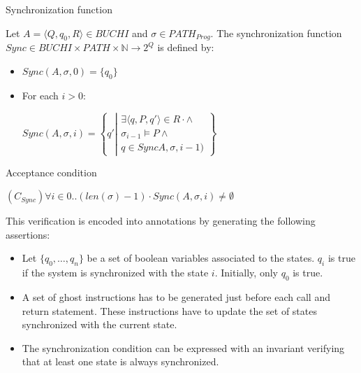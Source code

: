 \documentclass{frama-c-book}
\begin{document}
\begin{definition}{Synchronization function}
\label{def-synchro}

Let
${A=\langle Q,q_0,R \rangle \in \textit{BUCHI}}$ and
${\sigma \in \textit{PATH}_{\textit{Prog}}}$.
The synchronization function ${\textit{Sync}\in\textit{BUCHI} \times
  \textit{PATH} \times \mathbb{N} \rightarrow 2^Q}$ is defined by:

\begin{itemize}
\item $\textit{Sync}(A,\sigma,0) = \{q_0\}$
\item {\color{darkgray}For each $i>0$:}

\centerline{
${\textit{Sync}(A,\sigma,i) =
 \left \{ q' \left |  \begin{array}{c}
                                        \exists \langle q,P,q' \rangle
                                        \in R \cdot \wedge\\
                                        \sigma_{i-1} \models
                                        P \wedge\\
                                        q \in
                                        \textit{Sync}A,\sigma,i-1)
                                      \end{array}
  \right . \right \}} $}
\end{itemize}
\end{definition}

\begin{definition}{Acceptance condition}

\centering
$(C_{Sync})$\hfill $\forall i \in 0..(\textit{len}(\sigma)-1) \cdot
\textit{Sync}(A,\sigma,i) \not = \emptyset$\hfill ~
\end{definition}

This verification is encoded into annotations by generating the following assertions:

\begin{itemize}
  \item[Declaration] Let $\{q_0,\dots,q_n\}$ be a set of boolean variables
    associated to the states. $q_i$ is true if the system is synchronized with
    the state $i$. Initially, only $q_0$ is true.
  \item[Transitions] A set of ghost instructions has to be generated just before
    each call and return statement. These instructions have to update the set of
    states synchronized with the current state.
  \item[Synchronization] The synchronization condition can be expressed with an
    invariant verifying that at least one state is always synchronized.
\end{itemize}
\end{document}
